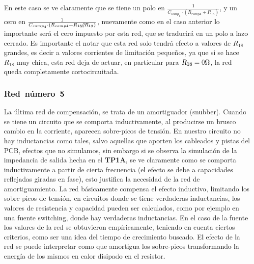 En este caso se ve claramente que se tiene un polo en $\frac{1}{ C_{comp_{4}} \cdot \left( R_{comp4} + R_{18} \right) }$, y un cero en $\frac{1}{ C_{comp_{4}} \cdot \left(  R_{comp4} + R_{18} \mathbin{\!/\mkern-5mu/\!} R_{19}  \right) }$, nuevamente como en el caso anterior lo importante será el cero impuesto por esta red, que se traducirá en un polo a lazo cerrado. Es importante el notar que esta red solo tendrá efecto a valores de $R_{18}$ grandes, es decir a valores corrientes de limitación pequeños, ya que si se hace $R_{18}$ muy chica, esta red deja de actuar, en particular para $R_{18} = 0 \si[per-mode=symbol]{\ohm}$, la red queda completamente cortocircuitada.


\subsubsection{\textbf{Red~número~5}}

La última red de compensación, se trata de un amortiguador (snubber). Cuando se tiene un circuito que se comporta inductivamente, al producirse un brusco cambio en la corriente, aparecen sobre-picos de tensión. En nuestro circuito no hay inductancias como tales, salvo aquellas que aporten los cableados y pistas del PCB, efectos que no simulamos, sin embargo si se observa la simulación de la impedancia de salida hecha en el \textbf{TP1A}, se ve claramente como se comporta inductivamente a partir de cierta frecuencia (el efecto se debe a capacidades reflejadas giradas en fase), esto justifica la necesidad de la red de amortiguamiento. La red básicamente compensa el efecto inductivo, limitando los sobre-picos de tensión, en circuitos donde se tiene verdaderas inductancias, los valores de resistencia y capacidad pueden ser calculados, como por ejemplo en una fuente switching, donde hay verdaderas inductancias. En el caso de la fuente los valores de la red se obtuvieron empíricamente, teniendo en cuenta ciertos criterios, como ser una idea del tiempo de crecimiento buscado. El efecto de la red se puede interpretar como que amortigua los sobre-picos transformando la energía de los mismos en calor disipado en el resistor.




